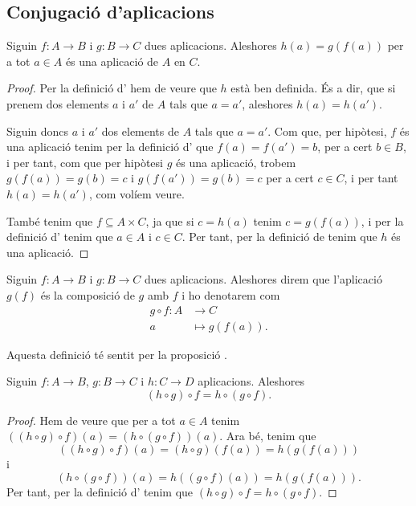 \documentclass[../Apunts.tex]{subfiles}
\begin{document}
	\subsection{Conjugació d'aplicacions}
	\begin{proposition}
		\label{prop:conjugació d'aplicacions}
		Siguin \(f\colon A\rightarrow B\) i \(g\colon B\rightarrow C\) dues aplicacions. Aleshores \(h(a)=g(f(a))\) per a tot \(a\in A\) és una aplicació de \(A\) en \(C\).
		\begin{proof}
			Per la definició d' hem de veure que \(h\) està ben definida. És a dir, que si prenem dos elements \(a\) i \(a'\) de \(A\) tals que \(a=a'\), aleshores \(h(a)=h(a')\).
			
			Siguin doncs \(a\) i \(a'\) dos elements de \(A\) tals que \(a=a'\). Com que, per hipòtesi, \(f\) és una aplicació tenim per la definició d' que \(f(a)=f(a')=b\), per a cert \(b\in B\), i per tant, com que per hipòtesi \(g\) és una aplicació, trobem \(g(f(a))=g(b)=c\) i \(g(f(a'))=g(b)=c\) per a cert \(c\in C\), i per tant \(h(a)=h(a')\), com volíem veure.
			
			També tenim que \(f\subseteq A\times C\), ja que si \(c=h(a)\) tenim \(c=g(f(a))\), i per la definició d' tenim que \(a\in A\) i \(c\in C\). Per tant, per la definició de  tenim que \(h\) és una aplicació.
		\end{proof}
	\end{proposition}
	\begin{definition}
		\label{def:conjugació d'aplicacions}
		Siguin \(f\colon A\rightarrow B\) i \(g\colon B\rightarrow C\) dues aplicacions. Aleshores direm que l'aplicació \(g(f)\) és la composició de \(g\) amb \(f\) i ho denotarem com
		\begin{align*}
		g\circ f\colon A&\longrightarrow C\\
		a&\longmapsto g(f(a)).
		\end{align*}
		
		Aquesta definició té sentit per la proposició \myref{prop:conjugació d'aplicacions}.
	\end{definition}
	\begin{proposition}
		\label{prop:associativitat de la conjugació de funcions}
		Siguin \(f\colon A\rightarrow B\), \(g\colon B\rightarrow C\) i \(h\colon C\rightarrow D\) aplicacions. Aleshores
		\[(h\circ g)\circ f=h\circ(g\circ f).\]
		\begin{proof}
			Hem de veure que per a tot \(a\in A\) tenim \(((h\circ g)\circ f)(a)=(h\circ(g\circ f))(a)\). Ara bé, tenim que
			\[((h\circ g)\circ f)(a)=(h\circ g)(f(a))=h(g(f(a)))\]
			i
			\[(h\circ(g\circ f))(a)=h((g\circ f)(a))=h(g(f(a))).\]
			Per tant, per la definició d' tenim que \((h\circ g)\circ f=h\circ(g\circ f)\).
		\end{proof}
	\end{proposition}
\end{document}
